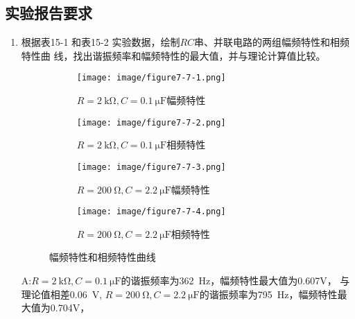\documentclass[UTF8]{article}
\begin{document}
        \subsection{实验报告要求}
            \begin{enumerate}[label=\textbf{\arabic*}.]
                \item 根据表15-1 和表15-2 实验数据，绘制$RC$串、并联电路的两组幅频特性和相频特性曲
                线，找出谐振频率和幅频特性的最大值，并与理论计算值比较。
                    \begin{figure}[H]
                        \centering
                        \begin{subfigure}[H]{0.45\textwidth}
                            \centering
                            \texttt{[image: image/figure7-7-1.png]}
                            \caption{$R = \SI{2}{\kilo\ohm}, C = \SI{0.1}{\micro\farad}$幅频特性}
                        \end{subfigure}
                        \hfill
                        \begin{subfigure}[H]{0.45\textwidth}
                            \centering
                            \texttt{[image: image/figure7-7-2.png]}
                            \caption{$R = \SI{2}{\kilo\ohm}, C = \SI{0.1}{\micro\farad}$相频特性}
                        \end{subfigure}
                        \begin{subfigure}[H]{0.45\textwidth}
                            \centering
                            \texttt{[image: image/figure7-7-3.png]}
                            \caption{$R = \SI{200}{\ohm}, C = \SI{2.2}{\micro\farad}$幅频特性}
                        \end{subfigure}
                        \hfill
                        \begin{subfigure}[H]{0.45\textwidth}
                            \centering
                            \texttt{[image: image/figure7-7-4.png]}
                            \caption{$R = \SI{200}{\ohm}, C = \SI{2.2}{\micro\farad}$相频特性}
                        \end{subfigure}
                        \caption{幅频特性和相频特性曲线}
                    \end{figure}
                    A:$R = \SI{2}{\kilo\ohm}, C = \SI{0.1}{\micro\farad}$的谐振频率为\SI{362}{\hertz}，幅频特性最大值为0.607V，
                    与理论值相差\SI{0.06}{\volt},
                    $R = \SI{200}{\ohm}, C = \SI{2.2}{\micro\farad}$的谐振频率为\SI{795}{\hertz}，幅频特性最大值为0.704V，

\end{enumerate}
\end{document}
